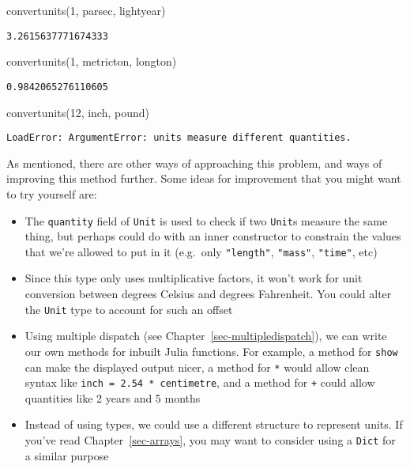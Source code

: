\documentclass[
  letterpaper,
  DIV=11,
  numbers=noendperiod]{scrreprt}
\newenvironment{Shaded}{\begin{snugshade}}{\end{snugshade}}
\newcommand{\FloatTok}[1]{\textcolor[rgb]{0.68,0.00,0.00}{#1}}
\newcommand{\FunctionTok}[1]{\textcolor[rgb]{0.28,0.35,0.67}{#1}}
\newcommand{\NormalTok}[1]{\textcolor[rgb]{0.00,0.23,0.31}{#1}}
\begin{document}
\begin{Shaded}
\begin{Highlighting}[]
\FunctionTok{convertunits}\NormalTok{(}\FloatTok{1}\NormalTok{, parsec, lightyear)}
\end{Highlighting}
\end{Shaded}

\begin{verbatim}
3.2615637771674333
\end{verbatim}

\begin{Shaded}
\begin{Highlighting}[]
\FunctionTok{convertunits}\NormalTok{(}\FloatTok{1}\NormalTok{, metricton, longton)}
\end{Highlighting}
\end{Shaded}

\begin{verbatim}
0.9842065276110605
\end{verbatim}

\begin{Shaded}
\begin{Highlighting}[]
\FunctionTok{convertunits}\NormalTok{(}\FloatTok{12}\NormalTok{, inch, pound)}
\end{Highlighting}
\end{Shaded}

\begin{verbatim}
LoadError: ArgumentError: units measure different quantities.
\end{verbatim}

As mentioned, there are other ways of approaching this problem, and ways
of improving this method further. Some ideas for improvement that you
might want to try yourself are:

\begin{itemize}
\item
  The \texttt{quantity} field of \texttt{Unit} is used to check if two
  \texttt{Unit}s measure the same thing, but perhaps could do with an
  inner constructor to constrain the values that we're allowed to put in
  it (e.g.~only \texttt{"length"}, \texttt{"mass"}, \texttt{"time"},
  etc)
\item
  Since this type only uses multiplicative factors, it won't work for
  unit conversion between degrees Celsius and degrees Fahrenheit. You
  could alter the \texttt{Unit} type to account for such an offset
\item
  Using multiple dispatch (see Chapter~\ref{sec-multipledispatch}), we
  can write our own methods for inbuilt Julia functions. For example, a
  method for \texttt{show} can make the displayed output nicer, a method
  for \texttt{*} would allow clean syntax like
  \texttt{inch\ =\ 2.54\ *\ centimetre}, and a method for \texttt{+}
  could allow quantities like 2 years and 5 months
\item
  Instead of using types, we could use a different structure to
  represent units. If you've read Chapter~\ref{sec-arrays}, you may want
  to consider using a \texttt{Dict} for a similar purpose
\end{itemize}
\end{document}
